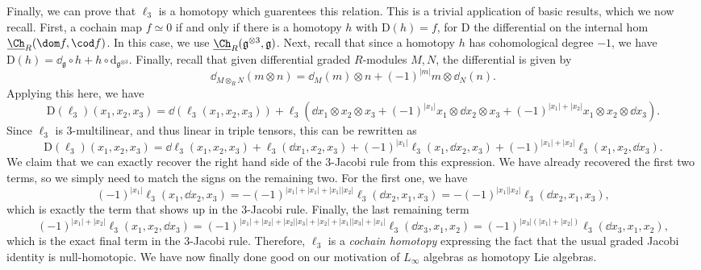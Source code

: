 Finally, we can prove that $\ell_3$ is a homotopy which guarentees this relation. This is a trivial application of basic results, which we now recall. First, a cochain map $f\simeq 0$ if and only if there is a homotopy $h$ with $\mathrm{D} (h)=f$, for $\mathrm{D} $ the differential on the internal hom $\underline{\Ch}_R(\dom f, \cod f)$. In this case, we use $\underline{\Ch}_R(\mathfrak{g} ^{\otimes 3} ,\mathfrak{g} )$. Next, recall that since a homotopy $h$ has cohomological degree $-1$, we have $\mathrm{D} (h) = \dd_{\mathfrak{g} } \circ h + h \circ  \mathrm{d}_{\mathfrak{g}^{\otimes 3} } $. Finally, recall that given differential graded $R$-modules $M,N$, the differential is given by
\[
	\dd _{M\otimes_RN}(m\otimes n) = \dd _M(m)\otimes n + (-1)^{\left| m \right| } m\otimes \dd_N(n)
.\]
Applying this here, we have
\[
	\mathrm{D} (\ell _3)(x_1,x_2,x_3) = \dd(\ell _3(x_1,x_2,x_3)) + \ell _3(\dd x_1 \otimes x_2 \otimes x_3 + (-1)^{\left| x_1 \right| } x_1 \otimes \dd x_2 \otimes x_3 +  (-1)^{\left| x_1 \right| +\left| x_2 \right| } x_1\otimes x_2\otimes \dd x_3)
.\]
Since $\ell _3$ is 3-multilinear, and thus linear in triple tensors, this can be rewritten as
\[
	\mathrm{D} (\ell _3)(x_1,x_2,x_3) = \dd \ell _3(x_1,x_2,x_3) + \ell _3(\dd x_1,x_2,x_3) + (-1)^{\left| x_1 \right| } \ell _3(x_1,\dd x_2,x_3) + (-1)^{\left| x_1 \right| +\left| x_2 \right| } \ell _3(x_1,x_2,\dd x_3)
.\]
We claim that we can exactly recover the right hand side of the 3-Jacobi rule from this expression. We have already recovered the first two terms, so we simply need to match the signs on the remaining two. For the first one, we have
\[
	(-1)^{\left| x_1 \right| } \ell _3(x_1,\dd x_2,x_3) = -(-1)^{\left| x_1 \right| +\left| x_1 \right| +\left| x_1 \right| \left| x_2 \right| } \ell _3(\dd x_2,x_1,x_3) = -(-1)^{\left| x_1 \right| \left| x_2 \right| } \ell _3(\dd x_2,x_1,x_3),
\]
which is exactly the term that shows up in the 3-Jacobi rule. Finally, the last remaining term
\[
	(-1)^{\left| x_1 \right| +\left| x_2 \right| } \ell _3(x_1,x_2,\dd x_3) = (-1)^{\left| x_1 \right| +\left| x_2 \right| +\left| x_2 \right| \left| x_3 \right| +\left| x_2 \right| +\left| x_1 \right| \left| x_3 \right| +\left| x_1 \right| } \ell _3(\dd x_3,x_1,x_2)=(-1)^{\left| x_3 \right| (\left| x_1 \right| +\left| x_2 \right| )} \ell _3(\dd x_3,x_1,x_2),
\]
which is the exact final term in the 3-Jacobi rule. Therefore, $\ell _3$ is a \emph{cochain homotopy} expressing the fact that the usual graded Jacobi identity is null-homotopic. We have now finally done good on our motivation of $L_\infty $ algebras as homotopy Lie algebras.

